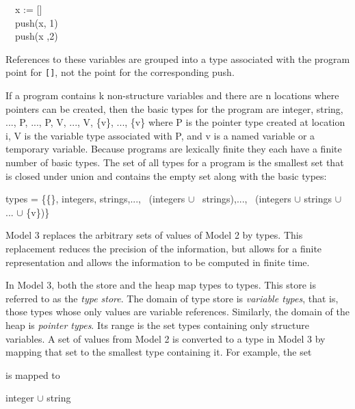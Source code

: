 \goodbreak
\begin{iconcode}
\ \ x := []\\
\ \ push(x, 1)\\
\ \ push(x ,2)\\
\end{iconcode}


References to these variables are grouped into a type associated with
the program point for \texttt{[]}, not the point for the corresponding
push.

If a program contains k non-structure variables and there are n
locations where pointers can be created, then the basic types for the
program are integer, string, ..., P, ...,
P, V, ..., V,
\{v\}, ..., \{v\} where
P is the pointer type created at location i,
V is the variable type associated with
P, and v is a named variable or a
temporary variable. Because programs are lexically finite they each
have a finite number of basic types. The set of all types for a
program is the smallest set that is closed under union and contains
the empty set along with the basic types:

\begin{specialcode}{}
\>types = \{\{\}, integers, strings,...,~%
    (integers ${\cup}$ \ strings),...,~%
    (integers ${\cup}$ strings ${\cup}$ ... ${\cup}$ \{v\})\}
\end{specialcode}

Model 3 replaces the arbitrary sets of values of Model 2 by
types. This replacement reduces the precision of the information, but
allows for a finite representation and allows the information to be
computed in finite time.

In Model 3, both the store and the heap map types to types. This store
is referred to as the \textit{type store}. The domain of type store is
\textit{variable types}, that is, those types whose only values are
variable references.  Similarly, the domain of the heap is
\textit{pointer types}. Its range is the set types containing only
structure variables. A set of values from Model 2 is converted to a
type in Model 3 by mapping that set to the smallest type containing
it. For example, the set


\noindent is mapped to

\begin{specialcode}{}
\>integer ${\cup}$ string\\
\end{specialcode}

